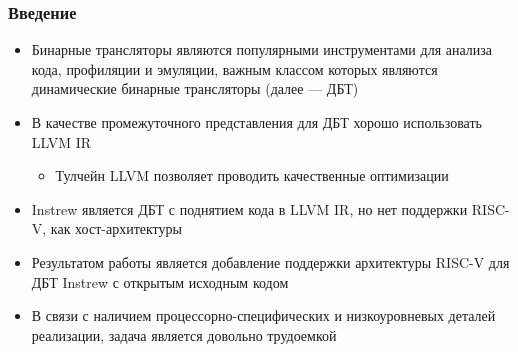 \documentclass{vkr-slides-style}
\begin{document}
\makeslidestitle

\begin{frame}
    \frametitle{Введение}
    \begin{itemize}
        \item Бинарные трансляторы являются популярными инструментами для анализа кода, профиляции и эмуляции, важным классом которых являются динамические бинарные трансляторы (далее --- ДБТ)
        \item В качестве промежуточного представления для ДБТ хорошо использовать LLVM IR
              \begin{itemize}
                  \item Тулчейн LLVM позволяет проводить качественные оптимизации
              \end{itemize}
        \item Instrew является ДБТ с поднятием кода в LLVM IR, но нет поддержки RISC-V, как хост-архитектуры
        \item Результатом работы является добавление поддержки архитектуры RISC-V для ДБТ Instrew с открытым исходным кодом
        \item В связи с наличием процессорно-специфических и низкоуровневых деталей реализации, задача является довольно трудоемкой
    \end{itemize}
\end{frame}
\end{document}

